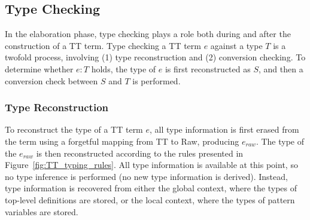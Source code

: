 \subsection{Type Checking}
\label{sec:type-checking}



In the elaboration phase, type checking plays a role both during and after the
construction of a TT term. Type checking a TT term $e$ against a type $T$ is a
twofold process, involving (1) type reconstruction and (2) conversion
checking. To determine whether $e : T$ holds, the type of $e$ is first
reconstructed as $S$, and then a conversion check between $S$ and $T$ is performed.

\subsubsection{Type Reconstruction}
To reconstruct the type of a TT term $e$, all type information is first erased from
the term using a forgetful mapping from TT to Raw, producing $e_{raw}$. The type of the $e_{raw}$ is
then reconstructed according to the rules presented in
Figure~\ref{fig:TT_typing_rules}. All type information is available at this
point, so no type inference is performed (no new type information is
derived). Instead, type information is recovered from either the global context,
where the types of top-level definitions are stored, or the local context, where
the types of pattern variables are stored.

